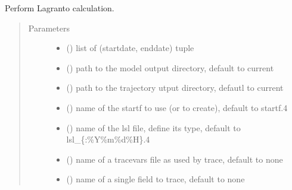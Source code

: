 \documentclass[a4paper,10pt,english]{sphinxmanual}
\begin{document}
\begin{fulllineitems}
\label{\detokenize{lagranto:lagranto.LagrantoRun}}
Perform Lagranto calculation.
\begin{quote}\begin{description}
\item[{Parameters}] \leavevmode\begin{itemize}
\item {} 
 () \textendash{} list of (startdate, enddate) tuple

\item {} 
 (\sphinxstyleliteralemphasis{, }) \textendash{} path to the model output directory, default to current

\item {} 
 (\sphinxstyleliteralemphasis{, }) \textendash{} path to the trajectory utput directory, defautl to current

\item {} 
 (\sphinxstyleliteralemphasis{, }) \textendash{} name of the startf to use (or to create), default to startf.4

\item {} 
 (\sphinxstyleliteralemphasis{, }) \textendash{} name of the lsl file, define its type, default to lsl\_\{:\%Y\%m\%d\%H\}.4

\item {} 
 (\sphinxstyleliteralemphasis{, }) \textendash{} name of a tracevars file as used by trace, default to none

\item {} 
 (\sphinxstyleliteralemphasis{, }) \textendash{} name of a single field to trace, default to none


\end{itemize}
\end{description}
\end{quote}
\end{fulllineitems}
\end{document}
